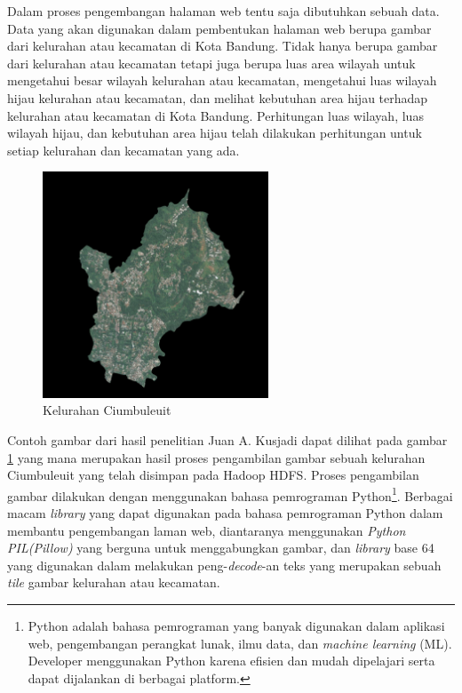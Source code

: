 Dalam proses pengembangan halaman web tentu saja dibutuhkan sebuah data. Data yang akan digunakan dalam pembentukan halaman web berupa gambar dari kelurahan atau kecamatan di Kota Bandung. Tidak hanya berupa gambar dari kelurahan atau kecamatan tetapi juga berupa luas area wilayah untuk mengetahui besar wilayah kelurahan atau kecamatan, mengetahui luas wilayah hijau kelurahan atau kecamatan, dan melihat kebutuhan area hijau terhadap kelurahan atau kecamatan di Kota Bandung. Perhitungan luas wilayah, luas wilayah hijau, dan kebutuhan area hijau telah dilakukan perhitungan untuk setiap kelurahan dan kecamatan yang ada. 

\begin{figure}[H]
	\centering
	\includegraphics[width=0.6\textwidth]{Gambar/Ciumbuleuit.png}
	\caption{Kelurahan Ciumbuleuit}
	\label{fig:ciumbuleuit}
\end{figure}

Contoh gambar dari hasil penelitian Juan A. Kusjadi dapat dilihat pada gambar \ref{fig:ciumbuleuit} yang mana merupakan hasil proses pengambilan gambar sebuah kelurahan Ciumbuleuit yang telah disimpan pada Hadoop HDFS. Proses pengambilan gambar dilakukan dengan menggunakan bahasa pemrograman Python\footnote{Python adalah bahasa pemrograman yang banyak digunakan dalam aplikasi web, pengembangan perangkat lunak, ilmu data, dan \textit{machine learning} (ML). Developer menggunakan Python karena efisien dan mudah dipelajari serta dapat dijalankan di berbagai platform.}. Berbagai macam \textit{library} yang dapat digunakan pada bahasa pemrograman Python dalam membantu pengembangan laman web, diantaranya menggunakan \textit{Python PIL(Pillow)} yang berguna untuk menggabungkan gambar, dan \textit{library} base 64 yang digunakan dalam melakukan peng-\textit{decode}-an teks yang merupakan sebuah \textit{tile} gambar kelurahan atau kecamatan.

